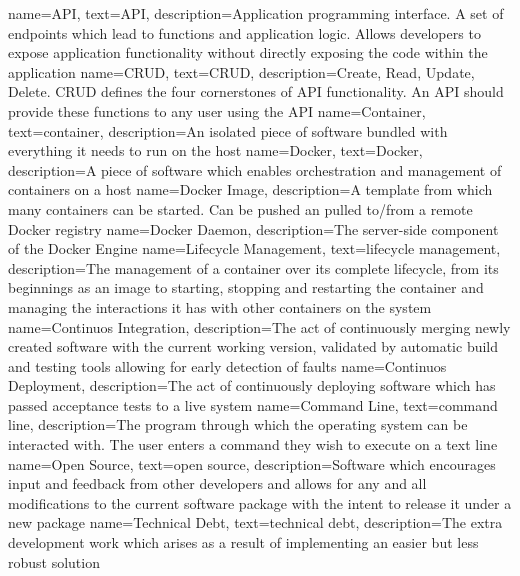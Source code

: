 {
    name={API},
    text={API},
    description={Application programming interface. A set of endpoints which lead to functions and application logic. Allows developers to expose application functionality without directly exposing the code within the application}
}
{
    name={CRUD},
    text={CRUD},
    description={Create, Read, Update, Delete. CRUD defines the four cornerstones of API functionality. An API should provide these functions to any user using the API}
}
{
    name={Container},
    text={container},
    description={An isolated piece of software bundled with everything it needs to run on the host}
}
{
		name={Docker},
    text={Docker},
		description={A piece of software which enables orchestration and management of containers on a host}
}
{
		name={Docker Image},
		description={A template from which many containers can be started. Can be pushed an pulled to/from a remote Docker registry}
}
{
		name={Docker Daemon},
		description={The server-side component of the Docker Engine}
}
{
		name={Lifecycle Management},
    text={lifecycle management},
		description={The management of a container over its complete lifecycle, from its beginnings as an image to starting, stopping and restarting the container and managing the interactions it has with other containers on the system}
}
{
		name={Continuos Integration},
		description={The act of continuously merging newly created software with the current working version, validated by automatic build and testing tools allowing for early detection of faults}
}
{
		name={Continuos Deployment},
		description={The act of continuously deploying software which has passed acceptance tests to a live system}
}
{
    name={Command Line},
    text={command line},
    description={The program through which the operating system can be interacted with. The user enters a command they wish to execute on a text line}
}
{
    name={Open Source},
    text={open source},
    description={Software which encourages input and feedback from other developers and allows for any and all modifications to the current software package with the intent to release it under a new package}
}
{
    name={Technical Debt},
    text={technical debt},
    description={The extra development work which arises as a result of implementing an easier but less robust solution}
}
